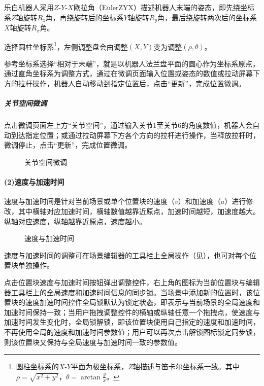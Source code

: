 乐白机器人采用$Z\textrm{-}Y\textrm{-}X$欧拉角（EulerZYX）描述机器人末端的姿态，即先绕坐标系$Z$轴旋转$R_z$角，再绕旋转后的坐标系$Y$轴旋转$R_y$角，最后绕旋转两次后的坐标系$X$轴旋转$R_x$角。

选择圆柱坐标系\footnote{圆柱坐标系的$X\textrm{-}Y$平面为极坐标系，$Z$轴描述与笛卡尔坐标系一致。其中 $\rho=\sqrt{x^2+y^2}$，$\theta=\arctan\frac{y}{x}$。}，左侧调整盘会由调整$(X, Y)$变为调整$(\rho, \theta)$。

参考坐标系选择“相对于末端”，就是以机器人法兰盘平面的圆心作为坐标系原点，通过直角坐标系为调整方式，通过在微调页面输入位置或姿态的数值或拉动屏幕下方的拉杆操作，机器人自动移动到指定位置后，点击“更新”，完成位置微调。

\subparagraph{关节空间微调}
点击微调页面左上方“关节空间”，通过输入关节1至关节6的角度数值，机器人会自动到达指定位置；或通过拉动屏幕下方各个方向的拉杆进行操作，当释放拉杆时，微调停止，点击“更新”，完成位置微调。

\begin{figure}[ht]
	\centering
	\color{red}{缺图}
	\caption{关节空间微调}
	\label{fig:关节空间微调}
\end{figure}

\paragraph{(2)\quad 速度与加速时间}
速度与加速时间是针对当前场景或单个位置块的速度（$v$）和加速度（$a$）进行修改，其中横轴对应加速时间，横轴数值越靠近原点，加速时间越短，加速度越大。纵轴对应速度，纵轴越靠近原点，速度越小。

\begin{figure}[ht]
	\centering
	\color{red}{缺图}
	\caption{速度与加速时间}
	\label{fig:速度与加速时间}
\end{figure}

速度与加速时间的调整可在场景编辑器的工具栏上全局操作（见），也可对每个位置块单独操作。

点击位置块速度与加速时间按钮弹出调整控件，右上角的图标为当前位置块与编辑器工具栏上的全局速度和加速时间信息的同步锁。当场景中添加新的位置时，该位置块的速度加速时间控件全局锁默认为锁定状态，即表示与当前场景的全局速度和加速时间保持一致；当用户拖拽调整控件的横轴或纵轴任意一个拖拽点，使速度与加速时间发生变化时，全局锁解锁，即该位置块使用自己指定的速度和加速时间，不再使用全局的速度和加速时间参数值；用户可以再次点击解锁图标锁定同步锁，则该位置块又保持与全局速度与加速时间一致的参数值。

